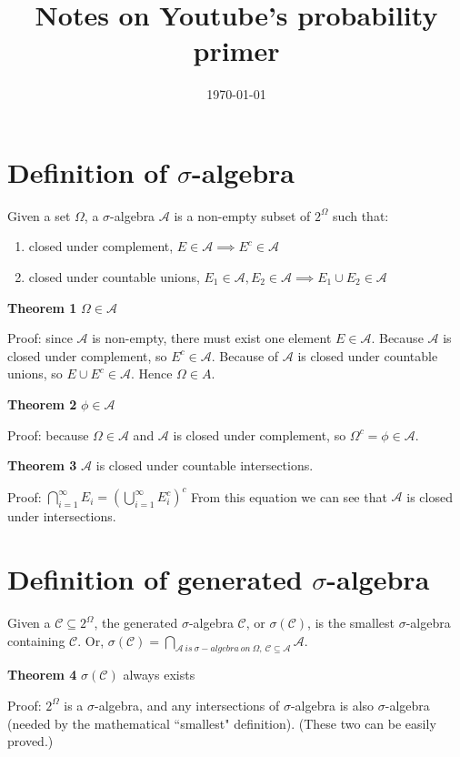 \documentclass[12pt]{article}
\title{Notes on Youtube's probability primer}
\date{\today}
\newcommand{\A}{\mathcal{A}}
\newcommand{\C}{\mathcal{C}}
\begin{document}
\maketitle

\section{Definition of $\sigma$-algebra}

Given a set $\Omega$, a $\sigma$-algebra $\A$ is a non-empty subset of $2^\Omega$ such that:

\begin{enumerate}
    \item closed under complement, $E\in \A \implies E^c \in \A$ 

    \item closed under countable unions, $E_1\in \A, E_2\in \A \implies E_1\cup E_2\in \A$
\end{enumerate}

\bigbreak

\textbf{Theorem 1} $\Omega\in \A$

Proof: since $\A$ is non-empty, there must exist one element $E\in \A$. Because $\A$ is closed
under complement, so $E^c\in \A$. Because of $\A$ is closed under countable unions, so
$E \cup E^c \in \A$. Hence $\Omega\in A$.
\bigbreak

\textbf{Theorem 2} $\phi \in \A$

Proof: because $\Omega \in \A$ and $\A$ is closed under complement, so $\Omega^c=\phi\in \A$.
\bigbreak

\textbf{Theorem 3} $\A$ is closed under countable intersections.

Proof: $\bigcap\limits_{i=1}^{\infty} E_i = (\bigcup\limits_{i=1}^{\infty} E_i^c)^c$
From this equation we can see that $\A$ is closed under intersections.

\section{Definition of generated $\sigma$-algebra}

Given a $\C\subseteq 2^\Omega$, the generated $\sigma$-algebra $\C$, or $\sigma(\C)$, is the smallest
$\sigma$-algebra containing $\C$.
Or, $\sigma(\C)=\bigcap\limits_{\A\ is\ \sigma-algebra\ on\ \Omega,\ \C\subseteq \A} \A$.
\bigbreak

\textbf{Theorem 4} $\sigma(\C)$ always exists

Proof: $2^\Omega$ is a $\sigma$-algebra, and any intersections of $\sigma$-algebra is also
$\sigma$-algebra (needed by the mathematical ``smallest" definition). (These two can be easily proved.)
\bigbreak
\end{document}
